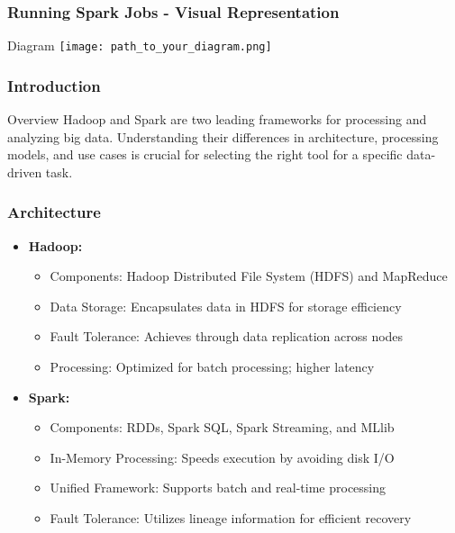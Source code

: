 \documentclass[aspectratio=169]{beamer}
\begin{document}
\begin{frame}
    \frametitle{Running Spark Jobs - Visual Representation}
    \begin{block}{Diagram}
        \texttt{[image: path\_to\_your\_diagram.png]} 
    \end{block}
\end{frame}

\begin{frame}[fragile]
    \frametitle{Introduction}
    \begin{block}{Overview}
        Hadoop and Spark are two leading frameworks for processing and analyzing big data. Understanding their differences in architecture, processing models, and use cases is crucial for selecting the right tool for a specific data-driven task.
    \end{block}
\end{frame}

\begin{frame}[fragile]
    \frametitle{Architecture}
    \begin{itemize}
        \item \textbf{Hadoop:}
        \begin{itemize}
            \item Components: Hadoop Distributed File System (HDFS) and MapReduce
            \item Data Storage: Encapsulates data in HDFS for storage efficiency
            \item Fault Tolerance: Achieves through data replication across nodes
            \item Processing: Optimized for batch processing; higher latency
        \end{itemize}
        
        \item \textbf{Spark:}
        \begin{itemize}
            \item Components: RDDs, Spark SQL, Spark Streaming, and MLlib
            \item In-Memory Processing: Speeds execution by avoiding disk I/O
            \item Unified Framework: Supports batch and real-time processing
            \item Fault Tolerance: Utilizes lineage information for efficient recovery
        \end{itemize}
    \end{itemize}
\end{frame}
\end{document}
